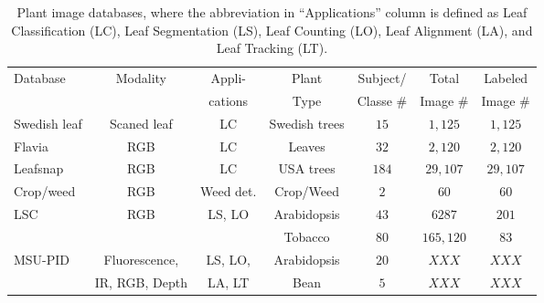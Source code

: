 \begin{table}[t!]
	\centering
	\caption{Plant image databases, where the abbreviation in ``Applications'' column is defined as Leaf Classification (LC), Leaf Segmentation (LS), Leaf Counting (LO), Leaf Alignment (LA), and Leaf Tracking (LT).}
	\resizebox{12cm}{!} {
	\begin{tabular}{l|c|c|c|c|c|c}
		\hline
		\multirow{2}{*}{Database}&  \multirow{2}{*}{Modality}  & Appli-& Plant & Subject/ &Total  &  Labeled   \\ 						
			&         & cations &            Type         &       Classe \#         &  Image \#    & Image \# \\ \hline
		
Swedish leaf &  Scaned leaf & LC& Swedish trees & $15$ & $1,125$ & $1,125$ \\ \hline
Flavia& RGB  & LC& Leaves & $32$  & $2,120$ & $2,120$ \\ \hline
Leafsnap  & RGB & LC& USA trees & $184$ & $29,107$  &  $29,107$ \\ \hline
Crop/weed &  RGB &Weed det. & Crop/Weed & $2$  & $60$ & $60$ \\ \hline
\multirow{2}{*}{LSC} & \multirow{2}{*}{RGB}  & \multirow{2}{*}{LS, LO} & Arabidopsis &  $43$ & $6287$ & $201$ \\ \cline{4-7}
							    &  & & Tobacco & $80$ & $165,120$ & $83$ \\ \hline
\multirow{2}{*}{MSU-PID}  & Fluorescence,  & LS, LO, & Arabidopsis &  $20$ & $XXX$ & $XXX$ \\ \cline{4-7}
							    & IR, RGB, Depth & LA, LT & Bean & $5$ & $XXX$ & $XXX$ \\ \hline
	       \hline
	\end{tabular}
	}
	\label{tab:database}
\end{table}